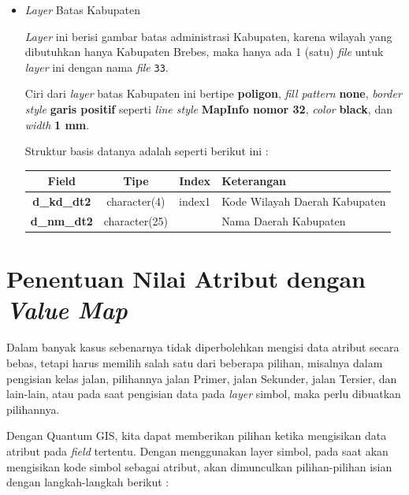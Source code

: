 \begin{itemize}
  \item \textit{Layer} Batas Kabupaten
  
  \textit{Layer} ini berisi gambar batas administrasi Kabupaten, karena wilayah yang dibutuhkan hanya Kabupaten Brebes, maka hanya ada 1 (satu) \textit{file} untuk \textit{layer} ini dengan nama \textit{file} \texttt{33}.
  
  Ciri dari \textit{layer} batas Kabupaten ini bertipe \textbf{poligon}, \textit{fill pattern} \textbf{none}, \textit{border style} \textbf{garis positif} seperti \textit{line style} \textbf{MapInfo nomor 32}, \textit{color} \textbf{black}, dan \textit{width} \textbf{1 mm}.
  
  Struktur basis datanya adalah seperti berikut ini :
  
  \begin{table}[H]
    \centering
    \begin{tabular}{| c | c | c | p{7cm} |}
      \hline
      Field & Tipe & Index & Keterangan \\
      \hline\hline
      \textbf{d\_kd\_dt2} & character(4) & index1 & Kode Wilayah Daerah Kabupaten \\
      \hline
      \textbf{d\_nm\_dt2} & character(25) & & Nama Daerah Kabupaten \\
      \hline
    \end{tabular}
  \end{table}

\end{itemize}

\section{Penentuan Nilai Atribut dengan \textit{Value Map}}

Dalam banyak kasus sebenarnya tidak diperbolehkan mengisi data atribut secara bebas, tetapi harus memilih salah satu dari beberapa pilihan, misalnya dalam pengisian kelas jalan, pilihannya jalan Primer, jalan Sekunder, jalan Tersier, dan lain-lain, atau pada saat pengisian data pada \textit{layer} simbol, maka perlu dibuatkan pilihannya.

Dengan Quantum GIS, kita dapat memberikan pilihan ketika mengisikan data atribut pada \textit{field} tertentu. Dengan menggunakan layer simbol, pada saat akan mengisikan kode simbol sebagai atribut, akan dimunculkan pilihan-pilihan isian dengan langkah-langkah berikut :

